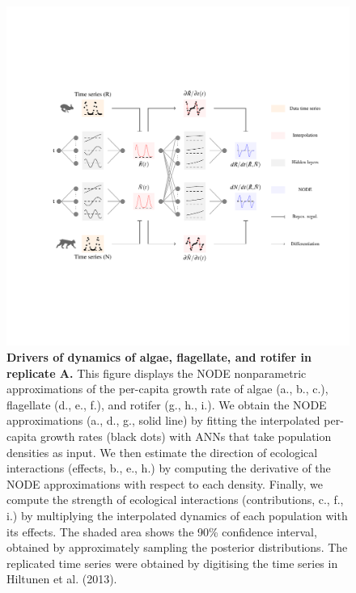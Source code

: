 \documentclass[11pt, oneside]{article}
\begin{document}
\newpage
\begin{figure}[H]
\begin{center}
\includegraphics[width=\linewidth,page=5]{figures/main.pdf}
\caption{
    \textbf{Drivers of dynamics of algae, flagellate, and rotifer in replicate A.}
    This figure displays the NODE nonparametric approximations of the per-capita growth rate of algae (a., b., c.), flagellate (d., e., f.), and rotifer (g., h., i.).
    We obtain the NODE approximations (a., d., g., solid line) by fitting the interpolated per-capita growth rates (black dots) with ANNs that take population densities as input.
    We then estimate the direction of ecological interactions (effects, b., e., h.) by computing the derivative of the NODE approximations with respect to each density.
    Finally, we compute the strength of ecological interactions (contributions, c., f., i.) by multiplying the interpolated dynamics of each population with its effects.
    The shaded area shows the 90\% confidence interval, obtained by approximately sampling the posterior distributions. 
    The replicated time series were obtained by digitising the time series in Hiltunen et al. (2013).
}
\end{center}
\end{figure}
\newpage
\end{document}
